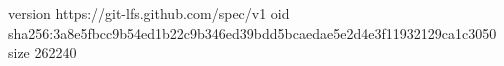 version https://git-lfs.github.com/spec/v1
oid sha256:3a8e5fbcc9b54ed1b22c9b346ed39bdd5bcaedae5e2d4e3f11932129ca1c3050
size 262240
